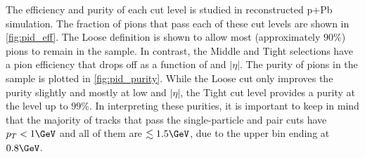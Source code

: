 The efficiency and purity of each cut level is studied in reconstructed p+Pb \Hijing simulation.
The fraction of pions that pass each of these cut levels are shown in \cref{fig:pid_eff}.
The Loose definition is shown to allow most (approximately $90\%$) pions to remain in the sample.
In contrast, the Middle and Tight selections have a pion efficiency that drops off as a function of \pt and $|\eta|$.
The purity of pions in the sample is plotted in \cref{fig:pid_purity}.
While the Loose cut only improves the purity slightly and mostly at low \pt and $|\eta|$, the Tight cut level provides a purity at the level up to $99\%$.
In interpreting these purities, it is important to keep in mind that the majority of tracks that pass the single-particle and pair cuts have $p_T < 1 \GeV$ and all of them are $\lesssim 1.5 \GeV$, due to the upper \kt bin ending at $0.8 \GeV$.

